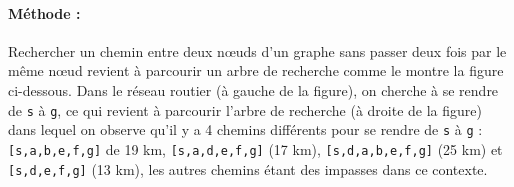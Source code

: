\paragraph{Méthode :} Rechercher un chemin entre deux n\oe uds d'un graphe sans passer 
deux fois par le même n\oe ud revient à parcourir un arbre de recherche comme le montre 
la figure ci-dessous. Dans le réseau routier (à gauche de la figure), on cherche à se rendre de 
\texttt{s} à \texttt{g}, ce qui revient à parcourir l'arbre de recherche (à droite de la figure)
dans lequel on observe qu'il y a 4 chemins différents pour se rendre de \texttt{s} à \texttt{g} :
\texttt{[s,a,b,e,f,g]} de 19 km, \texttt{[s,a,d,e,f,g]} (17 km), \texttt{[s,d,a,b,e,f,g]} (25 km)
et \texttt{[s,d,e,f,g]} (13 km), les autres chemins étant des impasses dans ce contexte. 
\vspace*{3mm}

